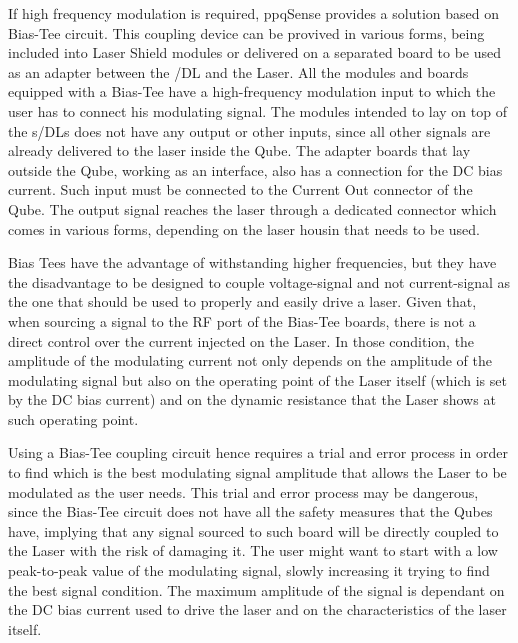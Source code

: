 \newline If high frequency modulation is required, ppqSense provides a solution based on Bias-Tee circuit. This coupling device can be provived in various forms, being included into Laser Shield modules or delivered on a separated board to be used as an adapter between the \QubeModel /DL and the Laser.
\newline All the modules and boards equipped with a Bias-Tee have a high-frequency modulation input to which the user has to connect his modulating signal. The modules intended to lay on top of the \QubeModel s/DLs does not have any output or other inputs, since all other signals are already delivered to the laser inside the Qube.
\newline The adapter boards that lay outside the Qube, working as an interface, also has a connection for the DC bias current. Such input must be connected to the Current Out connector of the Qube. The output signal reaches the laser through a dedicated connector which comes in various forms, depending on the laser housin that needs to be used.

\newline Bias Tees have the advantage of withstanding higher frequencies, but they have the disadvantage to be designed to couple voltage-signal and not current-signal as the one that should be used to properly and easily drive a laser.
\newline Given that, when sourcing a signal to the RF port of the Bias-Tee boards, there is not a direct control over the current injected on the Laser.
\newline In those condition, the amplitude of the modulating current not only depends on the amplitude of the modulating signal but also on the operating point of the Laser itself (which is set by the DC bias current) and on the dynamic resistance that the Laser shows at such operating point. \newline

\newline Using a Bias-Tee coupling circuit hence requires a trial and error process in order to find which is the best modulating signal amplitude that allows the Laser to be modulated as the user needs.
\newline This trial and error process may be dangerous, since the Bias-Tee circuit does not have all the safety measures that the Qubes have, implying that any signal sourced to such board will be directly coupled to the Laser with the risk of damaging it.
\newline The user might want to start with a low peak-to-peak value of the modulating signal, slowly increasing it trying to find  the best signal condition.
\newline The maximum amplitude of the signal is dependant on the DC bias current used to drive the laser and on the characteristics of the laser itself.